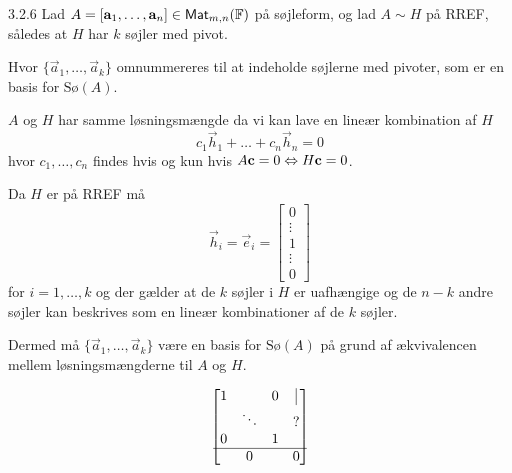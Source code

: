 \begin{saetning}{3.2.6}
	Lad $A = [\mathbf{a}_1, \dotsc, \mathbf{a}_n] \in
	\textsf{Mat}_{m,n}(\mathbb{F})$ på søjleform, og lad $A \sim H$ på RREF, således at
	$H$ har $k$ søjler med pivot.
	
	Hvor $\{\vec{a}_1, \dotsc, \vec{a}_k\}$ omnummereres til at indeholde
	søjlerne med pivoter, som er en basis for $\text{Sø}(A)$.
\end{saetning}

\begin{bevis}
	$A$ og $H$ har samme løsningsmængde da vi kan lave en lineær kombination af
	$H$
	\[
		c_1 \vec{h}_1 + \dotso + c_n \vec{h}_n = 0
	\]
	hvor $c_1,\dotsc,c_n$ findes hvis og kun hvis $A \mathbf{c} = 0 \Leftrightarrow H \mathbf{c}
	= 0$.

	Da $H$ er på RREF må
	\[
		\vec{h}_i = \vec{e}_i = \begin{bmatrix}
			0 \\
			\vdots \\
			1 \\
			\vdots \\
			0
		\end{bmatrix}
	\]
	for $i=1,\dotsc,k$ og der gælder at de $k$ søjler i $H$ er uafhængige og 
	de $n-k$ andre søjler kan beskrives som en lineær kombinationer af de $k$
	søjler.
	
	Dermed må $\{\vec{a}_1, \dotsc, \vec{a}_k\}$ være en basis for
	$\text{Sø}(A)$ på grund af ækvivalencen mellem løsningsmængderne til $A$ og
	$H$.
\end{bevis}

\[
	\begin{bmatrix}
		1 & 	   & 0 & \vline \\
		  & \ddots &   & ? \\
		0 &        & 1 & \\
		\hline 
		  &   0    &   & 0
	\end{bmatrix}
\]

